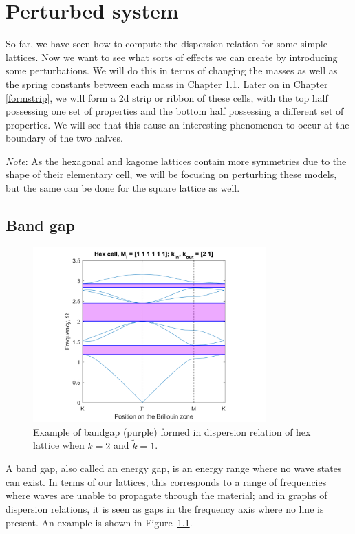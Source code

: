 \chapter{Perturbed system}
\label{perturbed}

So far, we have seen how to compute the dispersion relation for some simple
lattices. Now we want to see what sorts of effects we can create by introducing
some perturbations. We will do this in terms of changing the masses as well as
the spring constants between each mass in Chapter \ref{formbandgap}. Later on
in Chapter \ref{formstrip}, we will form a 2d strip or ribbon of these cells,
with the top half possessing one set of properties and the bottom half
possessing a different set of properties. We will see that this cause an
interesting phenomenon to occur at the boundary of the two halves.

\textit{Note}: As the hexagonal and kagome lattices contain more symmetries due
to the shape of their elementary cell, we will be focusing on perturbing these
models, but the same can be done for the square lattice as well. 

\section{Band gap}
\label{formbandgap}

\begin{figure}[!h]
\centering
\includegraphics[width=0.8\textwidth]{imgs/bandgapex.png}
\caption{\label{fig:bandgapex} Example of bandgap (purple) formed in dispersion
  relation of hex lattice when $k=2$ and $\tilde{k}=1$.}
\end{figure}

A band gap, also called an energy gap, is an energy range where no wave states
can exist. In terms of our lattices, this corresponds to a range of frequencies
where waves are unable to propagate through the material; and in graphs of
dispersion relations, it is seen as gaps in the frequency axis where no line
is present. An example is shown in Figure~\ref{fig:bandgapex}. 

